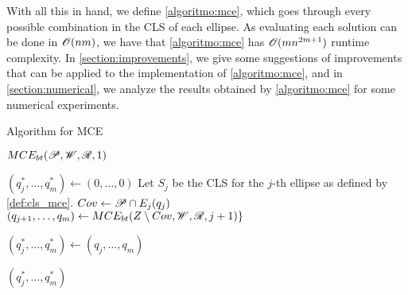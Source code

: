 With all this in hand, we define \autoref{algoritmo:mce}, which goes through every possible combination in the CLS of each ellipse. As evaluating each solution can be done in $\mathscr{O}(nm)$, we have that \autoref{algoritmo:mce} has $\mathscr{O}(mn^{2m+1})$ runtime complexity. 
In \autoref{section:improvements}, we give some suggestions of improvements that can be applied to the implementation of \autoref{algoritmo:mce}, and in \autoref{section:numerical}, we analyze the results obtained by \autoref{algoritmo:mce} for some numerical experiments.

\begin{algorithm}
	\caption{Algorithm for MCE}\label{algoritmo:mce}
	
	\begin{algorithmic}[1]
		
		
		\item[]
		\State \Return $MCE_{bt}(\mathscr{P}, \mathscr{W}, \mathscr{R}, 1)$
		\EndProcedure
		
		\item[]
		
		\State $(q_j^*, \dots, q_m^*) \gets (0, \dots, 0)$
		\State Let $S_j$ be the CLS for the $j$-th ellipse as defined by \autoref{def:cls_mce}.
			\State $Cov \gets \mathscr{P} \cap E_j(q_j)$
				\State $(q_{j+1}, \dots, q_m) \gets MCE_{bt}(Z \setminus Cov, \mathscr{W}, \mathscr{R}, j+1)\}$
			\EndIf
			
			\State $(q_j^*, \dots, q_m^*) \gets(q_j, \dots, q_m)$
			\EndIf
		\EndFor
		
		\State \Return $(q_j^*, \dots, q_m^*)$
		\EndProcedure
	\end{algorithmic}
\end{algorithm}